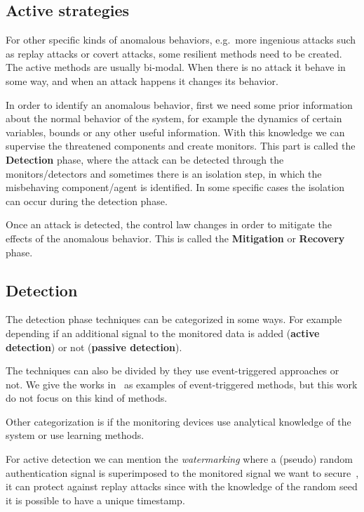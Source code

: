 \documentclass[../main.tex]{subfiles}
\begin{document}
\subsection{Active strategies}\label{sec:protecting_against_attacks}

For other specific kinds of anomalous behaviors, e.g.\ more ingenious attacks such as replay attacks or covert attacks, some resilient methods need to be created.
The active methods are usually bi-modal.
When there is no attack it behave in some way, and when an attack happens it changes its behavior.

In order to identify an anomalous behavior, first we need some prior information about the normal behavior of the system, for example the dynamics of certain variables, bounds or any other useful information.
With this knowledge we can supervise the threatened components and create monitors.
This part is called the \textbf{Detection} phase, where the attack can be detected through the monitors/detectors and sometimes there is an isolation step, in which the misbehaving component/agent is identified.
In some specific cases the isolation can occur during the detection phase.

Once an attack is detected, the control law changes in order to mitigate the effects of the anomalous behavior.
This is called the \textbf{Mitigation} or \textbf{Recovery} phase.

\subsection{Detection}

The detection phase techniques can be categorized in some ways.
For example depending if an additional signal to the monitored data is added (\textbf{active detection}) or not (\textbf{passive detection}).

The techniques can also be divided by they use event-triggered approaches or not.
We give the works in~\cite{SunYang2019,HuEtAl2021,SunEtAl2022} as examples of event-triggered methods, but this work do not focus on this kind of methods.

Other categorization is if the monitoring devices use analytical knowledge of the system or use learning methods.

For active detection we can mention the \emph{watermarking} where a (pseudo) random authentication signal is superimposed to the monitored signal we want to secure~\cite{MoSinopoli2009,MoEtAl2015,SatchidanandanKumar2017,KshetriVoas2017,LuciaEtAl2021}, it can protect against replay attacks since with the knowledge of the random seed it is possible to have a unique timestamp.
\end{document}
